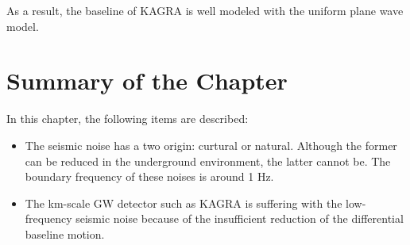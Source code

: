 As a result, the baseline of KAGRA is well modeled with the uniform plane wave model. 

\section{Summary of the Chapter}
In this chapter, the following items are described:
\begin{itemize}
\item The seismic noise has a two origin: curtural or natural. Although the former can be reduced in the underground environment, the latter cannot be. The boundary frequency of these noises is around 1 Hz.
\item The km-scale GW detector such as KAGRA is suffering with the low-frequency seismic noise because of the insufficient reduction of the differential baseline motion.
\end{itemize}
